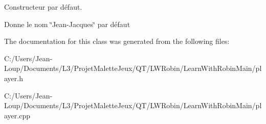 Constructeur par défaut. 

Donne le nom \char`\"{}\+Jean-\/\+Jacques\char`\"{} par défaut 

The documentation for this class was generated from the following files\+:\begin{DoxyCompactItemize}
\item 
C\+:/\+Users/\+Jean-\/\+Loup/\+Documents/\+L3/\+Projet\+Malette\+Jeux/\+Q\+T/\+L\+W\+Robin/\+Learn\+With\+Robin\+Main/player.\+h\item 
C\+:/\+Users/\+Jean-\/\+Loup/\+Documents/\+L3/\+Projet\+Malette\+Jeux/\+Q\+T/\+L\+W\+Robin/\+Learn\+With\+Robin\+Main/player.\+cpp\end{DoxyCompactItemize}
